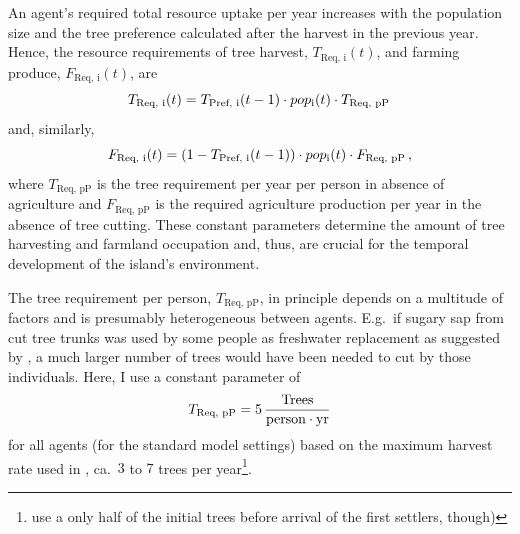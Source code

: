 An agent's required total resource uptake per year increases with the population size and the tree preference calculated after the harvest in the previous year.
Hence, the resource requirements of tree harvest, $T_\text{Req, i}(t)$, and farming produce, $F_\text{Req, i}(t)$, are 
\begin{equation}
T_\text{Req, i}(t) = T_\text{Pref, i}(t-1) \cdot pop_{\rm i}(t) \cdot T_\text{Req, pP} \, 
\end{equation}
and, similarly, 
\begin{equation}
F_\text{Req, i}(t) = (1-T_\text{Pref, i}(t-1)) \cdot pop_{\rm i}(t) \cdot F_\text{Req, pP}\, , 
\end{equation}
where $T_\text{Req, pP}$ is the tree requirement per year per person in absence of agriculture and $F_\text{Req, pP}$ is the required agriculture production per year in the absence of tree cutting.
These constant parameters determine the amount of tree harvesting and farmland occupation and, thus, are crucial for the temporal development of the island's environment. 

The tree requirement per person, $T_\text{Req, pP}$, in principle depends on a multitude of factors and is presumably heterogeneous between agents.
E.g.\ if sugary sap from cut tree trunks was used by some people as freshwater replacement as suggested by \citet{Mieth2015}, a much larger number of trees would have been needed to cut by those individuals.
Here, I use a constant parameter of 
\begin{equation}
T_\text{Req, pP} = 5\, \frac{\text{Trees}}{\rm person\cdot yr}
\end{equation}
for all agents (for the standard model settings) based on the maximum harvest rate used in \citet{Brandt2015}, ca.\ $3$ to $7$ trees per year\footnote{\citet{Brandt2015} use a only half of the initial trees before arrival of the first settlers, though)}. 

